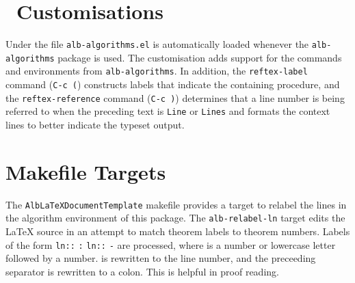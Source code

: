 \documentclass[11pt,a4paper,oneside,titlepage]{alb-corp}
\begin{document}

\section{\AUCTeX\ Customisations}
\label{sec:alb-algorithms-documentation:auctex-cust}

Under \AUCTeX{} the file \texttt{alb-algorithms.el} is automatically
loaded whenever the \texttt{alb-algorithms} package is used.  The
customisation adds support for the commands and environments from
\texttt{alb-algorithms}.  In addition, the \texttt{reftex-label} command
(\texttt{C-c (}) constructs labels that indicate the containing
procedure, and the \texttt{reftex-reference} command (\texttt{C-c )})
determines that a line number is being referred to when the preceding
text is \texttt{Line} or \texttt{Lines} and formats the context lines to
better indicate the typeset output.




\section{Makefile Targets}
\label{sec:alb-algorithms-documentation:makef-targ}

The \texttt{AlbLaTeXDocumentTemplate} makefile provides a target to
relabel the lines in the algorithm environment of this package.  The
\texttt{alb-relabel-ln} target edits the \LaTeX{} source in an attempt
to match theorem labels to theorem numbers.  Labels of the form
\texttt{ln:}\texttt{:}%
\texttt{:}
\texttt{ln:}\texttt{:}%
\texttt{-} are processed, where  is a
number or lowercase letter followed by a number.   is
rewritten to the line number, and the preceeding separator is rewritten
to a colon.  This is helpful in proof reading.
\end{document}
